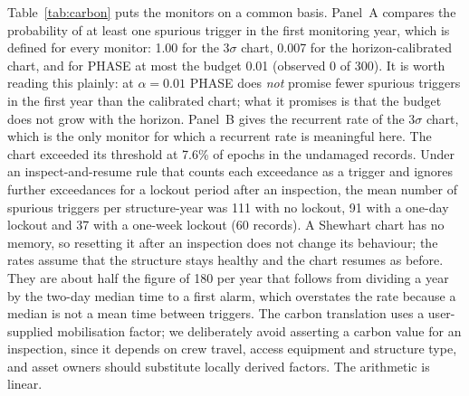 \documentclass[12pt,a4paper]{article}
\newenvironment{revblock}{}{}
\newenvironment{revblock}{\begingroup\color{revcol}}{\endgroup}
\begin{document}
\begin{revblock}
Table~\ref{tab:carbon} puts the monitors on a common basis. Panel~A compares the probability of at least one spurious trigger in the first monitoring year, which is defined for every monitor: 1.00 for the $3\sigma$ chart, 0.007 for the horizon-calibrated chart, and for PHASE at most the budget 0.01 (observed 0 of 300). It is worth reading this plainly: at $\alpha=0.01$ PHASE does \emph{not} promise fewer spurious triggers in the first year than the calibrated chart; what it promises is that the budget does not grow with the horizon. Panel~B gives the recurrent rate of the $3\sigma$ chart, which is the only monitor for which a recurrent rate is meaningful here. The chart exceeded its threshold at 7.6\% of epochs in the undamaged records. Under an inspect-and-resume rule that counts each exceedance as a trigger and ignores further exceedances for a lockout period after an inspection, the mean number of spurious triggers per structure-year was 111 with no lockout, 91 with a one-day lockout and 37 with a one-week lockout (60 records). A Shewhart chart has no memory, so resetting it after an inspection does not change its behaviour; the rates assume that the structure stays healthy and the chart resumes as before. They are about half the figure of 180 per year that follows from dividing a year by the two-day median time to a first alarm, which overstates the rate because a median is not a mean time between triggers.
\end{revblock}
The carbon translation uses a user-supplied mobilisation factor; we deliberately avoid asserting a carbon value for an inspection, since it depends on crew travel, access equipment and structure type, and asset owners should substitute locally derived factors. The arithmetic is linear.
\end{document}
